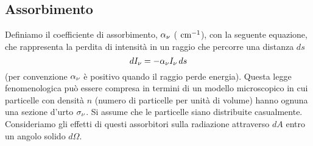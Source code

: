 \subsection{Assorbimento}
Definiamo il coefficiente di assorbimento, $\alpha_\nu$ ($\text{ cm}^{-1}$), con la seguente equazione, che rappresenta la perdita di intensità in un raggio che percorre una distanza $ds$
\begin{equation}
    dI_\nu=-\alpha_\nu I_\nu\,ds
    \label{005}
\end{equation}
(per convenzione $\alpha_\nu$ è positivo quando il raggio perde energia). Questa legge fenomenologica può essere compresa in termini di un modello microscopico in cui particelle con densità $n$ (numero di particelle per unità di volume) hanno ognuna una sezione d'urto $\sigma_\nu$. Si assume che le particelle siano distribuite casualmente. Consideriamo gli effetti di questi assorbitori sulla radiazione attraverso $dA$ entro un angolo solido $d\Omega$.